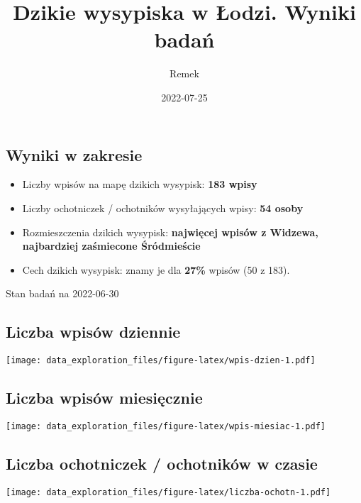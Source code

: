 \documentclass[
]{article}
\title{Dzikie wysypiska w Łodzi. Wyniki badań}
\author{Remek}
\date{2022-07-25}
\providecommand{\tightlist}{%
  \setlength{\itemsep}{0pt}\setlength{\parskip}{0pt}}
\begin{document}
\maketitle

{
\setcounter{tocdepth}{2}
\tableofcontents
}
\hypertarget{wyniki-w-zakresie}{%
\subsection{Wyniki w zakresie}\label{wyniki-w-zakresie}}

\begin{itemize}
\tightlist
\item
  Liczby wpisów na mapę dzikich wysypisk: \textbf{183 wpisy}
\item
  Liczby ochotniczek / ochotników wysyłających wpisy: \textbf{54 osoby}
\item
  Rozmieszczenia dzikich wysypisk: \textbf{najwięcej wpisów z Widzewa,
  najbardziej zaśmiecone Śródmieście}
\item
  Cech dzikich wysypisk: znamy je dla \textbf{27\%} wpisów (50 z 183).
\end{itemize}

Stan badań na 2022-06-30

\hypertarget{liczba-wpisuxf3w-dziennie}{%
\subsection{Liczba wpisów dziennie}\label{liczba-wpisuxf3w-dziennie}}

\texttt{[image: data\_exploration\_files/figure-latex/wpis-dzien-1.pdf]}

\hypertarget{liczba-wpisuxf3w-miesiux119cznie}{%
\subsection{Liczba wpisów
miesięcznie}\label{liczba-wpisuxf3w-miesiux119cznie}}

\texttt{[image: data\_exploration\_files/figure-latex/wpis-miesiac-1.pdf]}

\hypertarget{liczba-ochotniczek-ochotnikuxf3w-w-czasie}{%
\subsection{Liczba ochotniczek / ochotników w
czasie}\label{liczba-ochotniczek-ochotnikuxf3w-w-czasie}}

\texttt{[image: data\_exploration\_files/figure-latex/liczba-ochotn-1.pdf]}
\end{document}
